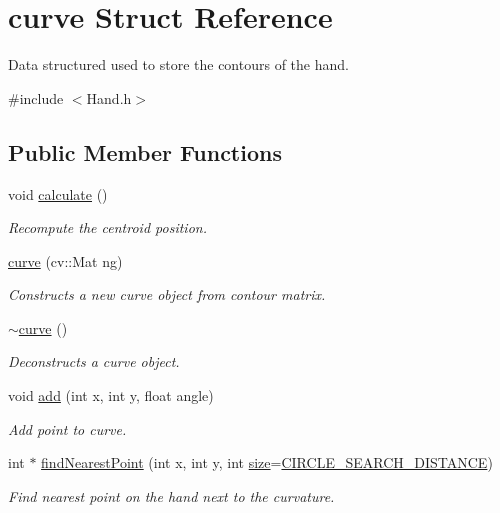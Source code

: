 \hypertarget{structcurve}{}\section{curve Struct Reference}
\label{structcurve}


Data structured used to store the contours of the hand.  




{\ttfamily \#include $<$Hand.\+h$>$}

\subsection*{Public Member Functions}
\begin{DoxyCompactItemize}
\item 
void \hyperlink{structcurve_ac2eb55cb594a07df07ae1c88b3036414}{calculate} ()
\begin{DoxyCompactList}\small\item\em Recompute the centroid position. \end{DoxyCompactList}\item 
\hyperlink{structcurve_aa067033135a192272005a3ae557a4f25}{curve} (cv\+::\+Mat ng)
\begin{DoxyCompactList}\small\item\em Constructs a new curve object from contour matrix. \end{DoxyCompactList}\item 
\hyperlink{structcurve_a0bacd81cfa6ed01251210d2e5d6b29a4}{$\sim$curve} ()
\begin{DoxyCompactList}\small\item\em Deconstructs a curve object. \end{DoxyCompactList}\item 
void \hyperlink{structcurve_aa4847c1d83d062c243ef641f67144cd0}{add} (int x, int y, float angle)
\begin{DoxyCompactList}\small\item\em Add point to curve. \end{DoxyCompactList}\item 
int $\ast$ \hyperlink{structcurve_a8cd0f602bdbc43b2ee5f4f7dc20e3c3a}{find\+Nearest\+Point} (int x, int y, int \hyperlink{structcurve_a6a90092a2b62540ae3993cdb469f8451}{size}=\hyperlink{_hand_8h_a7893cd55c6951c3b079134d8c56c200b}{C\+I\+R\+C\+L\+E\+\_\+\+S\+E\+A\+R\+C\+H\+\_\+\+D\+I\+S\+T\+A\+N\+CE})
\begin{DoxyCompactList}\small\item\em Find nearest point on the hand next to the curvature. \end{DoxyCompactList}\item 

\end{DoxyCompactItemize}
